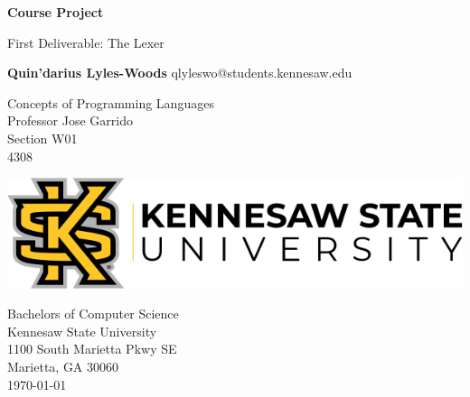 \begin{titlepage}
\begin{center}
	\vspace*{1cm}

	\Huge
	\textbf{Course Project}

	\vspace{0.5cm}
	\LARGE
	First Deliverable: The Lexer	

	\vspace{1.5cm}

	\textbf{Quin'darius Lyles-Woods}
	\Large
	qlyleswo@students.kennesaw.edu

	\vfill
	\LARGE
	Concepts of Programming Languages	\\
	Professor Jose Garrido			\\
	Section W01 				\\
	4308
	\vspace{0.8cm}

	\includegraphics[width=\textwidth]{kennesawlogo}

	\vspace{0.8cm}

	\Large
	Bachelors of Computer Science\\
	Kennesaw State University\\
	1100 South Marietta Pkwy SE\\
	Marietta, GA 30060\\
	\today	

	\vspace{1cm}

\end{center}
\end{titlepage}

